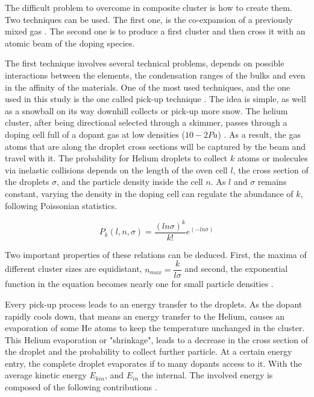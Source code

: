 The difficult problem to overcome in composite cluster is how to create them. Two techniques can be used. The first one, is the co-expansion of a previously mixed gas \cite{tchaplyguine_variable_2004}. The second one is to produce a first cluster and then cross it with an atomic beam of the doping species.

The first technique involves several technical problems, depends on possible interactions between the elements, the condensation ranges of the bulks and even in the affinity  of the materials. One of the most used techniques, and the one used in this study is the one called pick-up technique \cite{gough_infrared_1985}. The idea is simple, as well as a snowball on its way downhill collects or pick-up more snow. The helium cluster, after being directional selected through a skimmer, passes through a doping cell full of a dopant gas at low densities ($10-2 Pa$) \cite{stienkemeier_spectroscopy_2006}. As a result, the gas atoms that are along the droplet cross sections will be captured by the beam and travel with it. The probability for Helium droplets to collect $k$ atoms or molecules via inelastic collisions depends on the length of the oven cell $l$, the cross section of the droplets $\sigma $, and the particle density inside the cell $n$. As $l$ and $\sigma $ remains constant, varying the density in the doping cell can regulate the abundance of $k$, following Poissonian statistics.

\begin{equation}
P_{k}(l,n,\sigma)=\dfrac{(ln\sigma)^{k}}{k!} e^{(-ln\sigma)}
\end{equation}

Two important properties of these relations can be deduced. First, the maxima of different cluster sizes  are equidistant, $n_{max}=\dfrac{k}{l\sigma}$ and second, the exponential function in the equation  becomes  nearly  one for  small  particle  densities \cite{bunermann_modeling_2011}.

Every pick-up process leads to an energy transfer to the droplets. As the dopant rapidly cools down, that means an energy transfer to the Helium, causes an evaporation of some He atoms to keep the temperature unchanged in the cluster. This Helium evaporation or "shrinkage", leads to a decrease in the cross section of the droplet and the probability to collect further particle. At a certain energy entry, the complete droplet evaporates if to many dopants access to it. With the average kinetic energy $E_{kin}$, and $E_{in}$ the internal.  The involved energy is composed of the following contributions \cite{bunermann_modeling_2011}.

